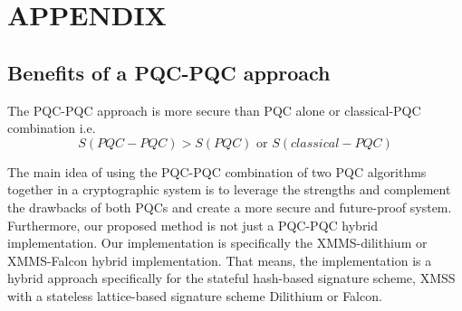 \documentclass[lettersize,journal]{IEEEtran}
\begin{document}
\clearpage

\section{APPENDIX}
\subsection{Benefits of a PQC-PQC approach}
\begin{prop}
The PQC-PQC approach is more secure than PQC alone or classical-PQC combination i.e.
\begin{equation}
    S(PQC-PQC) > S(PQC) \text{ or } S(classical-PQC)
\end{equation}
\end{prop}

The main idea of using the PQC-PQC combination of two PQC algorithms together in a cryptographic system is to leverage the strengths and complement the drawbacks of both PQCs and create a more secure and future-proof system.
Furthermore, our proposed method is not just a PQC-PQC hybrid implementation.
Our implementation is specifically the XMMS-dilithium or XMMS-Falcon hybrid implementation. 
That means, the implementation is a hybrid approach specifically for the stateful hash-based signature scheme, XMSS with a stateless lattice-based signature scheme Dilithium or Falcon.
\end{document}
